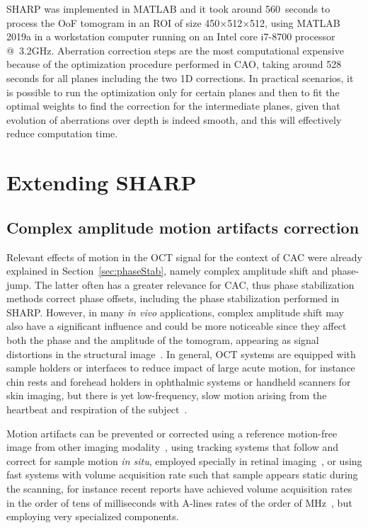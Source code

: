 SHARP was implemented in MATLAB and it took around 560~seconds to process the OoF tomogram in an ROI of size 450$\times$512$\times$512, using MATLAB 2019a in a workstation computer running on an Intel core i7-8700 processor @~3.2GHz. Aberration correction steps are the most computational expensive because of the optimization procedure performed in CAO, taking around 528 seconds for all planes including the two 1D corrections. In practical scenarios, it is possible to run the optimization only for certain planes and then to fit the optimal weights to find the correction for the intermediate planes, given that evolution of aberrations over depth is indeed smooth, and this will effectively reduce computation time.

\FloatBarrier

\section{Extending SHARP}\label{sec:Extensions}

\subsection{Complex amplitude motion artifacts correction}\label{sec:MotionCor}

Relevant effects of motion in the OCT signal for the context of CAC were already explained in Section~\ref{sec:phaseStab}, namely complex amplitude shift and phase-jump. The latter often has a greater relevance for CAC, thus phase stabilization methods correct phase offsets, including the phase stabilization performed in SHARP. However, in many \textit{in vivo} applications, complex amplitude shift may also have a significant influence and could be more noticeable since they affect both the phase and the amplitude of the tomogram, appearing as signal distortions in the structural image~\cite{Kraus2015_OCT}. In general, OCT systems are equipped with sample holders or interfaces to reduce impact of large acute motion, for instance chin rests and forehead holders in ophthalmic systems or handheld scanners for skin imaging, but there is yet low-frequency, slow motion arising from the heartbeat and respiration of the subject~\cite{Kraus2015_OCT}.

Motion artifacts can be prevented or corrected using a reference motion-free image from other imaging modality~\cite{Ricco2009_Correcting}, using tracking systems that follow and correct for sample motion \textit{in situ}, employed specially in retinal imaging~\cite{Maguluri2007_Three}, or using fast systems with volume acquisition rate such that sample appears static during the scanning, for instance recent reports have achieved volume acquisition rates in the order of tens of milliseconds with A-lines rates of the order of MHz~\cite{Auksorius2020_vivo}, but employing very specialized components.

